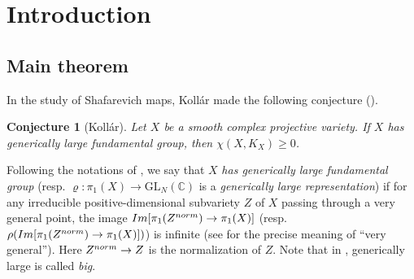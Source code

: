 \documentclass[11pt,a4paper,english]{smfart}
\theoremstyle{plain}
\newtheorem{conj}[theorem]{Conjecture}
\theoremstyle{definition}
\theoremstyle{plain}
\newcommand\GL{\mathrm{GL}}
\def\bC{\mathbb{C}}
\begin{document}
	\section{Introduction}
	\subsection{Main theorem}
	In the  study of Shafarevich maps, Koll\'ar made the following conjecture (\cite[Conjecture 18.12.1]{Kol95}).
\begin{conj}[Koll\'ar]\label{conj:kollar}
	Let $X$ be a smooth complex projective variety. If $X$ has generically large fundamental group, then $\chi(X,K_X)\geq 0$. 
\end{conj} 
	Following the notations of \cite{Kol95}, we say that $X$ \emph{has generically large fundamental group} (resp. $\varrho:\pi_1(X)\to \GL_N(\bC)$ is a \emph{generically large representation}) if for any irreducible positive-dimensional subvariety $Z$ of $X$ passing through a very general point, the image ${\rm Im}[\pi_1(Z^{\rm norm})\to \pi_1(X)]$ (resp. $\rho({\rm Im}[\pi_1(Z^{\rm norm})\to \pi_1(X)])$) is infinite (see \cite[Definition 2.4]{Kol95} for the precise meaning of ``very general''). Here $Z^{\rm norm}\to Z$ is the normalization of $Z$.     Note that in \cite{CDY22,DY23,DY24}, generically large is called \emph{big}.  
	
\end{document}
